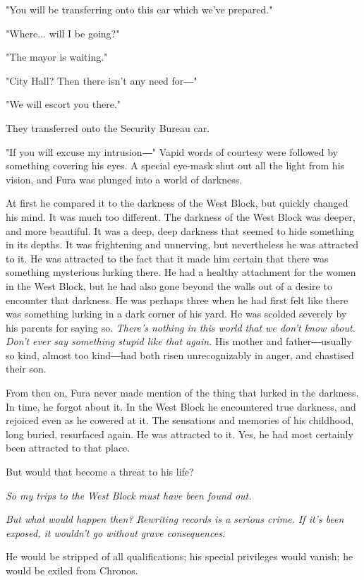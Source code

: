 "You will be transferring onto this car which we've prepared."

"Where... will I be going?"

"The mayor is waiting."

"City Hall? Then there isn't any need for―"

"We will escort you there."

They transferred onto the Security Bureau car.

"If you will excuse my intrusion―" Vapid words of courtesy were followed
by something covering his eyes. A special eye-mask shut out all the
light from his vision, and Fura was plunged into a world of darkness.

At first he compared it to the darkness of the West Block, but quickly
changed his mind. It was much too different. The darkness of the West
Block was deeper, and more beautiful. It was a deep, deep darkness that
seemed to hide something in its depths. It was frightening and
unnerving, but nevertheless he was attracted to it. He was attracted to
the fact that it made him certain that there was something mysterious
lurking there. He had a healthy attachment for the women in the West
Block, but he had also gone beyond the walls out of a desire to
encounter that darkness. He was perhaps three when he had first felt
like there was something lurking in a dark corner of his yard. He was
scolded severely by his parents for saying so. \emph{There's nothing in this
world that we don't know about. Don't ever say something stupid like
that again.} His mother and father―usually so kind, almost too kind―had
both risen unrecognizably in anger, and chastised their son.

From then on, Fura never made mention of the thing that lurked in the
darkness. In time, he forgot about it. In the West Block he encountered
true darkness, and rejoiced even as he cowered at it. The sensations and
memories of his childhood, long buried, resurfaced again. He was
attracted to it. Yes, he had most certainly been attracted to that
place.

But would that become a threat to his life?

\emph{So my trips to the West Block must have been found out.}

\emph{But what would happen then? Rewriting records is a serious crime. If
it's been exposed, it wouldn't go without grave consequences.}

He would be stripped of all qualifications; his special privileges would
vanish; he would be exiled from Chronos.

